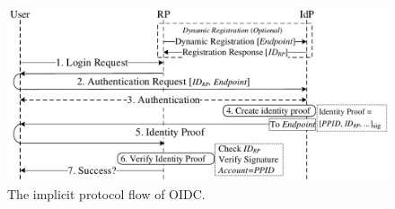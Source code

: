 \begin{figure}[t]
  \centering
  \includegraphics[width=\linewidth]{fig/OIDC1.pdf}
  \caption{The implicit protocol flow of OIDC.}
  \label{fig:OpenID}
\end{figure}

